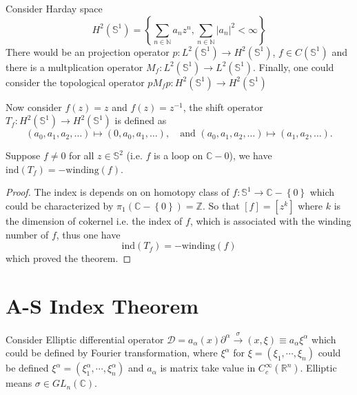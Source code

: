 \documentclass[10pt]{article}
\begin{document}
\begin{example}
  Consider Harday space
  \begin{equation*}
    H^{2}(\mathbb{S}^{1}) = \left\{ \sum_{n \in \mathbb{N}} a_{n} z^{n}, \sum_{n \in \mathbb{N}} \left| a_n \right|^{2} < \infty \right\}
  \end{equation*}
  There would be an projection operator $ p : L^{2}(\mathbb{S}^{1}) \rightarrow H^{2}(\mathbb{S}^{1})$, $ f \in C(\mathbb{S}^{1})$ and there is a multplication operator $ M_{f} : L^{2}(\mathbb{S}^{1}) \rightarrow L^{2}(\mathbb{S}^{1})$.
  Finally, one could consider the topological operator $ p M_{f} p : H^{2}(\mathbb{S}^{1}) \rightarrow H^{2}(\mathbb{S}^{1})$

  Now consider $ f(z) = z$ and $ f(z) = z^{-1}$, the shift operator $ T_{f} : H^{2}(\mathbb{S}^{1}) \rightarrow H^{2}(\mathbb{S}^{1})$ is defined as
  \begin{equation*}
    (a_0, a_1, a_2, \ldots) \mapsto (0, a_0, a_1, \ldots), \quad \text{and } (a_0, a_1, a_2, \ldots) \mapsto (a_1, a_2, \ldots).
  \end{equation*}
  \begin{theorem}
    Suppose $ f \neq 0$ for all $ z \in \mathbb{S}^{2}$ (i.e. $ f$ is a loop on $ \mathbb{C}- {0}$), we have $ \mathrm{ind}(T_{f}) = - \mathrm{winding}(f)$.
  \end{theorem}
  \begin{proof}
    The index is depends on on homotopy class of $ f: \mathbb{S}^{1} \rightarrow \mathbb{C}-\left\{ 0 \right\}$ which could be characterized by $ \pi_1(\mathbb{C}-\left\{ 0 \right\}) = \mathbb{Z}$. So that $[f] = [z^{k}]$ where $ k$ is the dimension of cokernel i.e. the index of $ f$, which is associated with the winding number of $ f$, thus one have
    \begin{equation*}
      \mathrm{ind}(T_{f}) = - \mathrm{winding}(f)
    \end{equation*}
    which proved the theorem.
  \end{proof}
\end{example}

\section{A-S Index Theorem}

Consider Elliptic differential operator $ \mathcal{D} = a_{\alpha}(x) \partial^{\alpha} \xrightarrow \sigma(x, \xi) \equiv a_{\alpha} \xi^{\alpha}$ which could be defined by Fourier transformation,
where $ \xi^{\alpha}$ for $ \xi = (\xi_{1},\cdots ,\xi_{n})$ could be defined  $ \xi^{\alpha} = (\xi_{1}^{\alpha}, \cdots ,\xi_{n}^{\alpha})$ and $ a_{\alpha}$ is matrix take value in $ C^{\infty }_{c}(\mathbb{R}^{n})$.
Elliptic means $ \sigma \in GL_{n}(\mathbb{C})$.

\label{LastPage}
\end{document}
